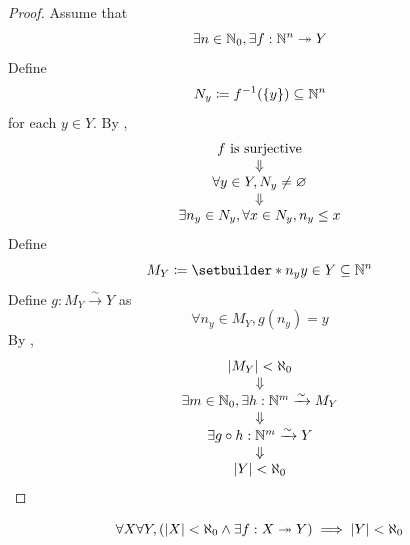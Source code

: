 \begin{proof}
    Assume that
    \[
    \exists n \in \N_{0}, \exists f: \N^{n} \twoheadrightarrow Y
    \]
    Define
    \[
    N_{y} \coloneqq f^{-1}(\set*{y}) \subseteq \N^{n}
    \]
    for each $y \in Y$. By ,
    \[
    \begin{array}{c}
        f \text{ is surjective} \\
        \Downarrow \\
        \forall y \in Y, N_{y} \neq \vnot \\
        \Downarrow \\
        \exists n_{y} \in N_{y}, \forall x \in N_{y}, n_{y} \leq x
    \end{array}
    \]
    Define
    \[
    M_{Y} \coloneqq \setbuilder*{n_{y}}{y \in Y} \subseteq \N^{n}
    \]
    Define $g: M_{Y} \xrightarrow{\sim} Y$ as
    \[
    \forall n_{y} \in M_{Y}, g(n_{y}) = y
    \]
    By ,
    \[
    \begin{array}{c}
        \abs*{M_{Y}} < \aleph_{0} \\
        \Downarrow \\
        \exists m \in \N_{0}, \exists h: \N^{m} \xrightarrow{\sim} M_{Y} \\
        \Downarrow \\
        \exists g \circ h: \N^{m} \xrightarrow{\sim} Y \\
        \Downarrow \\
        \abs*{Y} < \aleph_{0}
    \end{array}
    \]
\end{proof}

\bigskip

\begin{theorem} \label{an:thm:surjection-from-finite-set-implies-finite}
    \[
    \forall X \forall Y, \paren*{\abs*{X} < \aleph_{0} \land
    \exists f: X \twoheadrightarrow Y} \implies \abs*{Y} < \aleph_{0}
    \]
\end{theorem}
